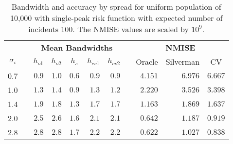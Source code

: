 \begin{table}[htbp]
\begin{center}
\begin{tabular}{lcrrrrrcrrr}
\toprule
\multicolumn{1}{c}{\bfseries }&\multicolumn{1}{c}{\bfseries }&\multicolumn{5}{c}{\bfseries Mean Bandwidths}&\multicolumn{1}{c}{\bfseries }&\multicolumn{3}{c}{\bfseries NMISE}\tabularnewline
\cline{3-7} \cline{9-11}
\multicolumn{1}{c}{$\sigma_i$}&\multicolumn{1}{c}{}&\multicolumn{1}{c}{$h_{o1}$}&\multicolumn{1}{c}{$h_{o2}$}&\multicolumn{1}{c}{$h_{s}$}&\multicolumn{1}{c}{$h_{cv1}$}&\multicolumn{1}{c}{$h_{cv2}$}&\multicolumn{1}{c}{}&\multicolumn{1}{c}{Oracle}&\multicolumn{1}{c}{Silverman}&\multicolumn{1}{c}{CV}\tabularnewline
\midrule
0.7&&$0.9$&$1.0$&$0.6$&$0.9$&$0.9$&&$4.151$&$6.976$&$6.667$\tabularnewline
1.0&&$1.3$&$1.4$&$0.9$&$1.3$&$1.2$&&$2.220$&$3.526$&$3.398$\tabularnewline
1.4&&$1.9$&$1.8$&$1.3$&$1.7$&$1.7$&&$1.163$&$1.869$&$1.637$\tabularnewline
2.0&&$2.5$&$2.6$&$1.6$&$2.1$&$2.1$&&$0.642$&$1.187$&$0.919$\tabularnewline
2.8&&$2.8$&$2.8$&$1.7$&$2.2$&$2.2$&&$0.622$&$1.027$&$0.838$\tabularnewline
\bottomrule
\end{tabular}
\caption[Bandwidth and accuracy by spread of incidents]{Bandwidth and accuracy by spread for uniform population of 10,000 with single-peak risk function with expected number of incidents 100. The NMISE values are scaled by $10^9$.\label{tab:results:bandwidth_vs_spread}}\end{center}
\end{table}
